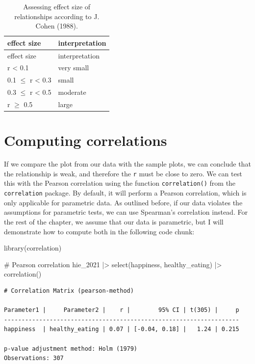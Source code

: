 \documentclass[
  letterpaper,
]{krantz}
\makeatletter
\newenvironment{Shaded}{\begin{snugshade}}{\end{snugshade}}
\newcommand{\CommentTok}[1]{\textcolor[rgb]{0.37,0.37,0.37}{#1}}
\newcommand{\FunctionTok}[1]{\textcolor[rgb]{0.28,0.35,0.67}{#1}}
\newcommand{\NormalTok}[1]{\textcolor[rgb]{0.00,0.23,0.31}{#1}}
\newcommand{\SpecialCharTok}[1]{\textcolor[rgb]{0.37,0.37,0.37}{#1}}
\newenvironment{kframe}{%
\medskip{}
\setlength{\fboxsep}{.8em}
 \def\at@end@of@kframe{}%
 \ifinner\ifhmode%
  \def\at@end@of@kframe{\end{minipage}}%
  \begin{minipage}{\columnwidth}%
 \fi\fi%
 \def\FrameCommand##1{\hskip\@totalleftmargin \hskip-\fboxsep
 \colorbox{shadecolor}{##1}\hskip-\fboxsep
     \hskip-\linewidth \hskip-\@totalleftmargin \hskip\columnwidth}%
 \MakeFramed {\advance\hsize-\width
   \@totalleftmargin\z@ \linewidth\hsize
   \@setminipage}}%
 {\par\unskip\endMakeFramed%
 \at@end@of@kframe}
\renewenvironment{Shaded}{\begin{kframe}}{\end{kframe}}
\makeatother
\begin{document}
\begin{longtable}[]{@{}ll@{}}
\caption{Assessing effect size of relationships according to J. Cohen
(1988).}\label{tbl-effect-size-cohen}\tabularnewline
\toprule\noalign{}
effect size & interpretation \\
\midrule\noalign{}
\endfirsthead
\toprule\noalign{}
effect size & interpretation \\
\midrule\noalign{}
\endhead
\bottomrule\noalign{}
\endlastfoot
r \textless{} 0.1 & very small \\
0.1 \(\leq\) r \textless{} 0.3 & small \\
0.3 \(\leq\) r \textless{} 0.5 & moderate \\
r \(\geq\) 0.5 & large \\
\end{longtable}

\section{Computing correlations}\label{sec-computing-correlations}

If we compare the plot from our data with the sample plots, we can
conclude that the relationship is weak, and therefore the \texttt{r}
must be close to zero. We can test this with the Pearson correlation
using the function \texttt{correlation()} from the \texttt{correlation}
package. By default, it will perform a Pearson correlation, which is
only applicable for parametric data. As outlined before, if our data
violates the assumptions for parametric tests, we can use Spearman's
correlation instead. For the rest of the chapter, we assume that our
data is parametric, but I will demonstrate how to compute both in the
following code chunk:

\begin{Shaded}
\begin{Highlighting}[]
\FunctionTok{library}\NormalTok{(correlation)}

\CommentTok{\# Pearson correlation}
\NormalTok{hie\_2021 }\SpecialCharTok{|\textgreater{}}
  \FunctionTok{select}\NormalTok{(happiness, healthy\_eating) }\SpecialCharTok{|\textgreater{}}
  \FunctionTok{correlation}\NormalTok{()}
\end{Highlighting}
\end{Shaded}

\begin{verbatim}
# Correlation Matrix (pearson-method)

Parameter1 |     Parameter2 |    r |        95% CI | t(305) |     p
-------------------------------------------------------------------
happiness  | healthy_eating | 0.07 | [-0.04, 0.18] |   1.24 | 0.215

p-value adjustment method: Holm (1979)
Observations: 307
\end{verbatim}
\end{document}
